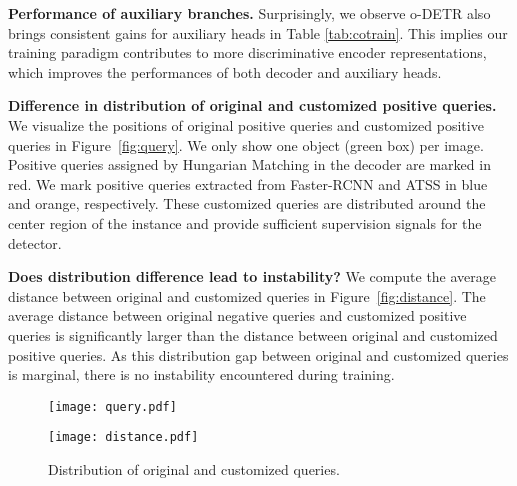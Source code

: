 \vspace{1mm}
\noindent\textbf{Performance of auxiliary branches.}
Surprisingly, we observe o-DETR also brings consistent gains for auxiliary heads in Table \ref{tab:cotrain}.
This implies our training paradigm contributes to more discriminative encoder representations, which improves the performances of both decoder and auxiliary heads.

\vspace{1mm}
\noindent\textbf{Difference in distribution of original and customized positive queries.}
We visualize the positions of original positive queries and customized positive queries in Figure~\ref{fig:query}.
We only show one object (green box) per image. 
Positive queries assigned by Hungarian Matching in the decoder are marked in red. 
We mark positive queries extracted from Faster-RCNN and ATSS in blue and orange, respectively.
These customized queries are distributed around the center region of the instance and provide sufficient supervision signals for the detector.

\vspace{1mm}
\noindent\textbf{Does distribution difference lead to instability?}
We compute the average distance between original and customized queries in Figure~\ref{fig:distance}.
The average distance between original negative queries and customized positive queries is significantly larger than the distance between original and customized positive queries.
As this distribution gap between original and customized queries is marginal, there is no instability encountered during training.

\begin{figure}[t]
    \begin{minipage}[t]{0.45\linewidth}
        \centering
        \texttt{[image: query.pdf]}
        \label{fig:query}
    \end{minipage}
    \hspace{2mm}
    \begin{minipage}[t]{0.45\linewidth}
        \centering
        \texttt{[image: distance.pdf]}
        \label{fig:distance}
    \end{minipage}
    \label{fig:distribution}
    \vspace{-0.2cm}
    \caption{
    Distribution of original and customized queries.}
    \vspace{-0.1cm}
\end{figure}



%

